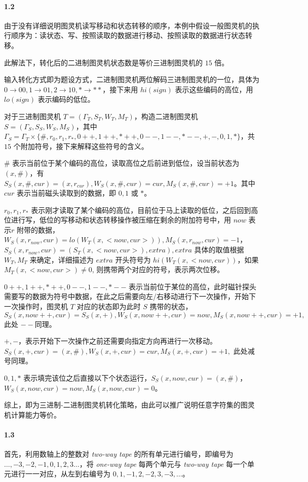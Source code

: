 \documentclass[12pt, a4paper, oneside]{ctexart}
\begin{document}
	\paragraph{1.2}
	由于没有详细说明图灵机读写移动和状态转移的顺序，本例中假设一般图灵机的执行顺序为：读状态、写、按照读取的数据进行移动、按照读取的数据进行状态转移。
	
	此解法下，转化后的二进制图灵机状态数是等价三进制图灵机的 $15$ 倍。
	
	输入转化方式即为题设方式，二进制图灵机两位解码三进制图灵机的一位，具体为 $0\rightarrow00,1\rightarrow01,2\rightarrow10,*\rightarrow**$，接下来用 $hi(sign)$ 表示这些编码的高位，用 $lo(sign)$ 表示编码的低位。
	
	对于三进制图灵机 $T=(\Gamma_T,S_T,W_T,M_T)$，构造二进制图灵机 $S=(\Gamma_S,S_S,W_S,M_S)$，其中 $\Gamma_S=\Gamma_T\times\{\#,r_0,r_1,r_*,0++,1++,*++,0--,1--,*--,+,-,0,1,*\}$，共 $15$ 个附加符号，接下来解释这些符号的含义。
	
	$\#$ 表示当前位于某个编码的高位，读取高位之后前进到低位，设当前状态为 $(x,\#)$，有$S_S(x,\#,cur)=(x,r_{cur}),W_S(x,\#,cur)=cur,M_S(x,\#,cur)=+1$。其中 $cur$ 表示当前磁头读取到的数据，即 $0,1$ 或 $*$。
	
	$r_0,r_1,r_*$ 表示刚才读取了某个编码的高位，目前位于马上读取的低位，之后回到高位进行写，低位的写移动和状态转移操作被压缩在剩余的附加符号中，用 $now$ 表示$r$ 附带的数据，$W_S(x,r_{now},cur)=lo(W_T(x,<now,cur>)),M_S(x,r_{now},cur)=-1$，$S_S(x,r_{now},cur)=(S_T(x,<now,cur>), extra), extra$ 具体的取值根据 $W_T,M_T$ 来确定，详细描述为 $extra$ 开头符号为 $hi(W_T(x,<now,cur))$，如果 $M_T(x,<now,cur>)\neq 0$, 则携带两个对应的符号，表示两次位移。
	
	$0++,1++,*++,0--,1--,*--$ 表示当前位于某位的高位，此时磁针探头需要写的数据为符号中数据，在此之后需要向左/右移动进行下一次操作，开始下一次操作时，图灵机 $T$ 对应的状态即为此时 $S$ 携带的状态，$S_S(x,now++,cur)=S_S(x,+),W_S(x,now++,cur)=now, M_S(x,now++,cur)=+1,$ 此处 $--$同理。
	
	$+,-$，表示开始下一次操作之前还需要向指定方向再进行一次移动。 $S_S(x,+,cur)=(x,\#),W_S(x,+,cur)=cur,M_S(x,+,cur)=+1,$ 此处减号同理。
	
	$0,1,*$ 表示填完该位之后直接以下个状态运行，$S_S(x,now,cur)=(x,\#)$，$W_S(x,now,cur)=now,M_S(x,now,cur) = 0$。
	
	综上，即为三进制-二进制图灵机转化策略，由此可以推广说明任意字符集的图灵机计算能力等价。
	
	\paragraph{1.3}
	首先，利用数轴上的整数对 \textit{two-way tape} 的所有单元进行编号，即编号为 $\dots,-3,-2,-1,0,1,2,3\dots$，将 \textit{one-way tape} 每两个单元与 \textit{two-way tape} 每一个单元进行一一对应，从左到右编号为 $0,1,-1,2,-2,3,-3,\dots$。
	
\end{document}
